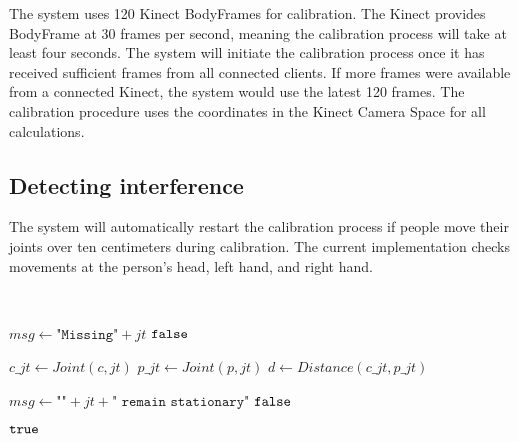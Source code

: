 The system uses 120 Kinect BodyFrames for calibration. The Kinect provides BodyFrame at 30 frames per second, meaning the calibration process will take at least four seconds. The system will initiate the calibration process once it has received sufficient frames from all connected clients. If more frames were available from a connected Kinect, the system would use the latest 120 frames. The calibration procedure uses the coordinates in the Kinect Camera Space for all calculations.

\subsection{Detecting interference}

The system will automatically restart the calibration process if people move their joints over ten centimeters during calibration. The current implementation checks movements at the person's head, left hand, and right hand.


\begin{algorithm}[ht,width=0.9\columnwidth]
    \caption{$\Function{RemainStationary}(jt, c, p, msg)$}
    \\
    \label{algo:prm}
    \begin{algorithmic}[1]
        \setcounter{ALC@line}{0}
        \vspace*{1mm}

          \STATE $msg \leftarrow \texttt{"Missing"} + jt$
          \RETURN $\False$
        \ENDIF

        \STATE $c\_jt \leftarrow Joint(c, jt)$
        \STATE $p\_jt \leftarrow Joint(p, jt)$
        \STATE $d \leftarrow Distance(c\_jt, p\_jt)$

          \STATE $msg \leftarrow \texttt{""} + jt + \texttt{" remain stationary"}$
          \RETURN $\False$
        \ENDIF

        \RETURN $\True$
    \end{algorithmic}
\end{algorithm}


